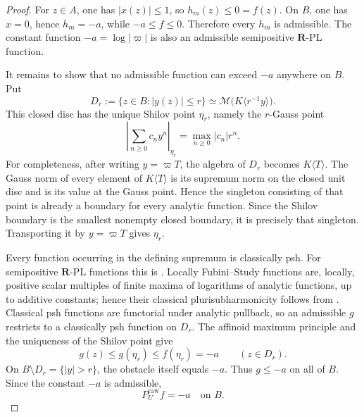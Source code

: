 \begin{proof}
For \(z\in A\), one has \(|x(z)|\leq1\), so \(h_m(z)\leq0=f(z)\).
On \(B\), one has \(x=0\), hence \(h_m=-a\), while
\(-a\leq f\leq0\).  Therefore every \(h_m\) is admissible.  The constant
function \(-a=\log|\varpi|\) is also an admissible semipositive
\(\mathbf R\)-PL function.

It remains to show that no admissible function can exceed \(-a\) anywhere
on \(B\).  Put
\[
 D_r:=\{z\in B:|y(z)|\leq r\}
       \simeq\mathcal M\bigl(K\langle r^{-1}y\rangle\bigr).
\]
This closed disc has the unique Shilov point \(\eta_r\), namely the
\(r\)-Gauss point
\begin{equation}
\label{eq:ch15-nodal-r-gauss}
 \left|\sum_{n\geq0}c_ny^n\right|_{\eta_r}
       =\max_{n\geq0}|c_n|r^n.
\end{equation}
For completeness, after writing \(y=\varpi T\), the algebra of \(D_r\)
becomes \(K\langle T\rangle\).  The Gauss norm of every element of
\(K\langle T\rangle\) is its supremum norm on the closed unit disc and is
its value at the Gauss point.  Hence the singleton consisting of that point
is already a boundary for every analytic function.  Since the Shilov
boundary is the smallest nonempty closed boundary, it is precisely that
singleton.  Transporting it by \(y=\varpi T\) gives \(\eta_r\).

Every function occurring in the defining supremum is classically psh.  For
semipositive \(\mathbf R\)-PL functions this is
\cite[Theorem~4.3]{GR25Classical}.  Locally Fubini--Study functions are,
locally, positive scalar multiples of finite maxima of logarithms of
analytic functions, up to additive constants; hence their classical
plurisubharmonicity follows from
\cite[Proposition~4.2(1)--(3)]{GR25Classical}.  Classical psh functions are
functorial under analytic pullback, so an admissible \(g\) restricts to a
classically psh function on \(D_r\).  The affinoid maximum principle
\cite[Theorem~6.4]{GR25Classical} and the uniqueness of the Shilov point give
\begin{equation}
\label{eq:ch15-nodal-disc-maximum}
             g(z)\leq g(\eta_r)
                    \leq f(\eta_r)
                    =-a
             \qquad (z\in D_r).
\end{equation}
On \(B\setminus D_r=\{|y|>r\}\), the obstacle itself equals \(-a\).
Thus \(g\leq-a\) on all of \(B\).  Since the constant \(-a\) is admissible,
\begin{equation}
\label{eq:ch15-nodal-raw-on-b}
                         P_U^{\mathrm{raw}}f=-a
                         \quad\text{on }B.
\end{equation}


\end{proof}
